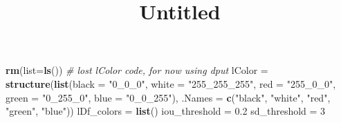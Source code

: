 \documentclass[]{article}
\title{Untitled}
\author{}
\date{}
\newenvironment{Shaded}{\begin{snugshade}}{\end{snugshade}}
\newcommand{\KeywordTok}[1]{\textcolor[rgb]{0.13,0.29,0.53}{\textbf{#1}}}
\newcommand{\DataTypeTok}[1]{\textcolor[rgb]{0.13,0.29,0.53}{#1}}
\newcommand{\DecValTok}[1]{\textcolor[rgb]{0.00,0.00,0.81}{#1}}
\newcommand{\FloatTok}[1]{\textcolor[rgb]{0.00,0.00,0.81}{#1}}
\newcommand{\StringTok}[1]{\textcolor[rgb]{0.31,0.60,0.02}{#1}}
\newcommand{\CommentTok}[1]{\textcolor[rgb]{0.56,0.35,0.01}{\textit{#1}}}
\newcommand{\NormalTok}[1]{#1}
\begin{document}
\maketitle

\begin{Shaded}
\begin{Highlighting}[]
\KeywordTok{rm}\NormalTok{(}\DataTypeTok{list=}\KeywordTok{ls}\NormalTok{())}
\CommentTok{# lost lColor code, for now using dput}
\NormalTok{lColor =}\StringTok{ }\KeywordTok{structure}\NormalTok{(}\KeywordTok{list}\NormalTok{(}\DataTypeTok{black =} \StringTok{"0_0_0"}\NormalTok{, }\DataTypeTok{white =} \StringTok{"255_255_255"}\NormalTok{, }\DataTypeTok{red =} \StringTok{"255_0_0"}\NormalTok{, }
    \DataTypeTok{green =} \StringTok{"0_255_0"}\NormalTok{, }\DataTypeTok{blue =} \StringTok{"0_0_255"}\NormalTok{), }\DataTypeTok{.Names =} \KeywordTok{c}\NormalTok{(}\StringTok{"black"}\NormalTok{, }
\StringTok{"white"}\NormalTok{, }\StringTok{"red"}\NormalTok{, }\StringTok{"green"}\NormalTok{, }\StringTok{"blue"}\NormalTok{))}
\NormalTok{lDf_colors =}\StringTok{ }\KeywordTok{list}\NormalTok{()}
\NormalTok{iou_threshold =}\StringTok{ }\FloatTok{0.2}
\NormalTok{sd_threshold =}\StringTok{ }\DecValTok{3}
\end{Highlighting}
\end{Shaded}
\end{document}
